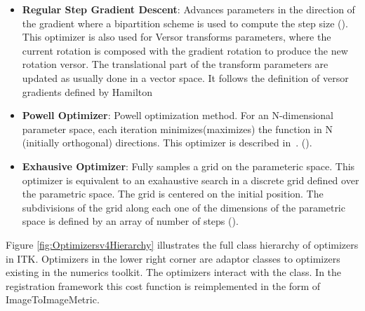 \begin{itemize}
\item \textbf{Regular Step Gradient Descent}: Advances parameters in the
direction of the gradient where a bipartition scheme is used to compute
the step size ().
This optimizer is also used for Versor transforms parameters, where the
current rotation is composed with the gradient rotation to produce the
new rotation versor. The translational part of the transform parameters
are updated as usually done in a vector space. It follows the definition
of versor gradients defined by Hamilton~\cite{Hamilton1866}

\item \textbf{Powell Optimizer}: Powell optimization method.  For an
N-dimensional parameter space, each iteration minimizes(maximizes) the function
in N (initially orthogonal) directions. This optimizer is described
in~\cite{Press1992}.  ().

\item \textbf{Exhausive Optimizer}: Fully samples a grid on the parameteric space.
This optimizer is equivalent to an exahaustive search in a discrete grid defined
over the parametric space. The grid is centered on the initial position. The
subdivisions of the grid along each one of the dimensions of the parametric space
is defined by an array of number of steps
().

\end{itemize}

Figure \ref{fig:Optimizersv4Hierarchy} illustrates the full class hierarchy of
optimizers in ITK. Optimizers in the lower right corner are adaptor classes
to optimizers existing in the  numerics toolkit. The optimizers
interact with the  class. In the registration framework
this cost function is reimplemented in the form of ImageToImageMetric.
